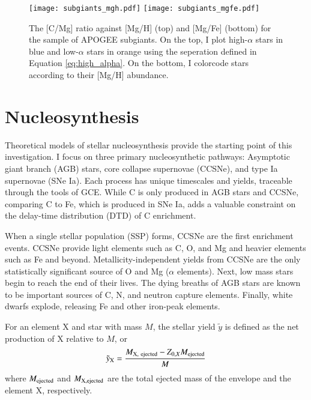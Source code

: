 \documentclass[12pt,oneside]{report}
\begin{document}
\begin{figure}[htp]
    \texttt{[image: subgiants\_mgh.pdf]}
    \texttt{[image: subgiants\_mgfe.pdf]}
    \caption[APOGEE Subgiants]{The [C/Mg] ratio against [Mg/H] (top) and [Mg/Fe] (bottom) for the \citet{jack_subgiant} sample of APOGEE subgiants. On the top, I plot high-$\alpha$ stars in blue and low-$\alpha$ stars in orange using the seperation defined in Equation \ref{eq:high_alpha}. On the bottom, I colorcode stars according to their [Mg/H] abundance.}
    \label{fig:subgiants}
\end{figure}
\chapter{Nucleosynthesis}

Theoretical models of stellar nucleosynthesis provide the starting point of this investigation. I focus on three primary nucleosynthetic pathways: Asymptotic giant branch (AGB) stars, core collapse supernovae (CCSNe), and type Ia supernovae (SNe Ia). Each process has unique timescales and yields, traceable through the tools of GCE. While C is only produced in AGB stars and CCSNe, comparing C to Fe, which is produced in SNe Ia, adds a valuable constraint on the delay-time distribution (DTD) of C enrichment.

When a single stellar population (SSP) forms, CCSNe are the first enrichment events. CCSNe provide light elements such as C, O, and Mg and heavier elements such as Fe and beyond. Metallicity-independent yields from CCSNe are the only statistically significant source of O and Mg ($\alpha$ elements). Next, low mass stars begin to reach the end of their lives. The dying breaths of AGB stars are known to be important sources of C, N, and neutron capture elements.  Finally, white dwarfs explode, releasing Fe and other iron-peak elements.


For an element X and star with mass $M$, the stellar yield $\tilde{y}$ is defined as the net production of X relative to $M$, or
\begin{equation}
    \tilde{y}_{\rm X} = \frac{M_{\rm X,\ ejected} - Z_{0, X} M_{\rm ejected}}{M}   
\end{equation}
where $M_{\rm ejected}$ and $M_{\rm X, ejected}$  are the total ejected mass of the envelope and the element X, respectively. 
\end{document}
